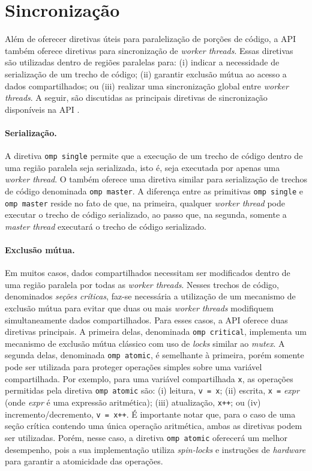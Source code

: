 \documentclass{SBCbookchapter}
\begin{document}
\section{Sincronização}
\label{section: sincronizacao}

	Além de oferecer diretivas úteis para paralelização de porções de
	código, a API \openmp também oferece diretivas para sincronização de
	\textit{worker threads}. Essas diretivas são utilizadas dentro de
	regiões paralelas para: (i) indicar a necessidade de serialização de
	um trecho de código; (ii) garantir exclusão mútua ao acesso a dados
	compartilhados; ou (iii) realizar uma sincronização global entre
	\textit{worker threads}. A seguir, são discutidas as principais
	diretivas de sincronização disponíveis na API \openmp.

		\paragraph{Serialização.} A diretiva \texttt{omp single} permite
		que a execução de um trecho de código dentro de uma região
		paralela seja serializada, isto é, seja executada por apenas
		uma \textit{worker thread}. O \openmp também oferece uma diretiva
		similar para serialização de trechos de código denominada
		\texttt{omp master}. A diferença entre as primitivas \texttt{omp
		single} e \texttt{omp master} reside no fato de que, na
		primeira, qualquer \textit{worker thread} pode executar o trecho
		de código serializado, ao passo que, na segunda, somente a
		\textit{master thread} executará o trecho de código serializado.
		
		\paragraph{Exclusão mútua.} Em muitos casos, dados
		compartilhados necessitam ser modificados dentro de uma região
		paralela por todas as \textit{worker threads}. Nesses trechos de
		código, denominados \textit{seções críticas}, faz-se necessária
		a utilização de um mecanismo de exclusão mútua para evitar que
		duas ou mais \textit{worker threads} modifiquem simultaneamente
		dados compartilhados.  Para esses casos, a API \openmp oferece
		duas diretivas principais. A primeira delas, denominada
		\texttt{omp critical}, implementa um mecanismo de exclusão mútua
		clássico com uso de \textit{locks} similar ao \textit{mutex}. A
		segunda delas, denominada \texttt{omp atomic}, é semelhante à
		primeira, porém somente pode ser utilizada para proteger
		operações simples sobre uma variável compartilhada.  Por
		exemplo, para uma variável compartilhada \texttt{x}, as
		operações permitidas pela diretiva \texttt{omp atomic} são: (i)
		leitura, \eg \texttt{v = x}; (ii) escrita, \eg \texttt{x =}
		\textit{expr} (onde \textit{expr} é uma expressão aritmética);
		(iii) atualização, \eg \texttt{x++}; ou (iv)
		incremento/decremento, \eg \texttt{v = x++}.  É importante notar
		que, para o caso de uma seção crítica contendo uma única
		operação aritmética, ambas as diretivas podem ser utilizadas.
		Porém, nesse caso, a diretiva \texttt{omp atomic} oferecerá um
		melhor desempenho, pois a sua implementação utiliza
		\textit{spin-locks} e instruções de \textit{hardware} para
		garantir a atomicidade das operações.
		
\end{document}
